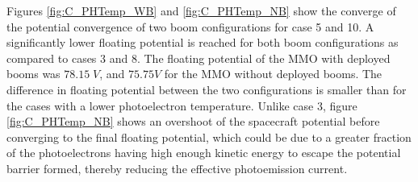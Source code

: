 Figures \ref{fig:C_PHTemp_WB} and \ref{fig:C_PHTemp_NB} show the converge of the potential convergence of two boom configurations for case 5 and 10. A significantly lower floating potential is reached for both boom configurations as compared to cases 3 and 8. The floating potential of the MMO with deployed booms was $78.15 \; V$, and $75.75 V$ for the MMO without deployed booms. The difference in floating potential between the two configurations is smaller than for the cases with a lower photoelectron temperature. Unlike case 3, figure \ref{fig:C_PHTemp_NB} shows an overshoot of the spacecraft potential before converging to the final floating potential, which could be due to a greater fraction of the photoelectrons having high enough kinetic energy to escape the potential barrier formed, thereby reducing the effective photoemission current. 

